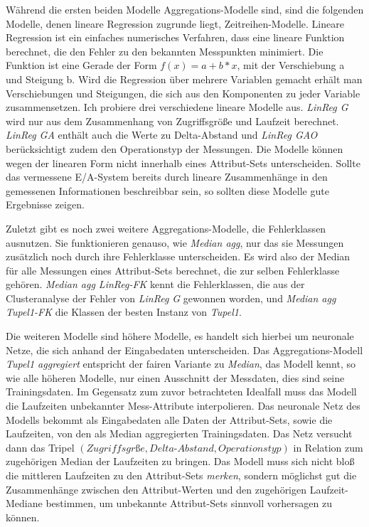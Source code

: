 \documentclass[
	12pt,
	a4paper,
	BCOR10mm,
	DIV14,
	listof=totoc,
	bibliography=totoc,
	headsepline
]{scrreprt}
\begin{document}
Während die ersten beiden Modelle Aggregations-Modelle sind, sind die folgenden Modelle, denen lineare Regression zugrunde liegt, Zeitreihen-Modelle.
Lineare Regression ist ein einfaches numerisches Verfahren, dass eine lineare Funktion berechnet, die den Fehler zu den bekannten Messpunkten minimiert.
Die Funktion ist eine Gerade der Form $f(x) = a + b*x$, mit der Verschiebung a und Steigung b. Wird die Regression über mehrere Variablen gemacht erhält man Verschiebungen und Steigungen, die sich aus den Komponenten zu jeder Variable zusammensetzen.
Ich probiere drei verschiedene lineare Modelle aus.
\textit{LinReg G} wird nur aus dem Zusammenhang von Zugriffsgröße und Laufzeit berechnet.
\textit{LinReg GA} enthält auch die Werte zu Delta-Abstand und \textit{LinReg GAO} berücksichtigt zudem den Operationstyp der Messungen.
Die Modelle können wegen der linearen Form nicht innerhalb eines Attribut-Sets unterscheiden. Sollte das vermessene E/A-System bereits durch lineare Zusammenhänge in den gemessenen Informationen beschreibbar sein, so sollten diese Modelle gute Ergebnisse zeigen.

Zuletzt gibt es noch zwei weitere Aggregations-Modelle, die Fehlerklassen ausnutzen.
Sie funktionieren genauso, wie \textit{Median agg}, nur das sie Messungen zusätzlich noch durch ihre Fehlerklasse unterscheiden. Es wird also der Median für alle Messungen eines Attribut-Sets berechnet, die zur selben Fehlerklasse gehören.
\textit{Median agg LinReg-FK} kennt die Fehlerklassen, die aus der Clusteranalyse der Fehler von \textit{LinReg G} gewonnen worden, und \textit{Median agg Tupel1-FK} die Klassen der besten Instanz von \textit{Tupel1}.

Die weiteren Modelle sind höhere Modelle, es handelt sich hierbei um neuronale Netze, die sich anhand der Eingabedaten unterscheiden.
Das Aggregations-Modell \textit{Tupel1 aggregiert} entspricht der fairen Variante zu \textit{Median}, das Modell kennt, so wie alle höheren Modelle, nur einen Ausschnitt der Messdaten, dies sind seine Trainingsdaten.
Im Gegensatz zum zuvor betrachteten Idealfall muss das Modell die Laufzeiten unbekannter Mess-Attribute interpolieren.
Das neuronale Netz des Modells bekommt als Eingabedaten alle Daten der Attribut-Sets, sowie die Laufzeiten, von den als Median aggregierten Trainingsdaten.
Das Netz versucht dann das Tripel $(Zugriffsgr\text{ß}e, Delta\text{-}Abstand, Operationstyp)$ in Relation zum zugehörigen Median der Laufzeiten zu bringen.
Das Modell muss sich nicht bloß die mittleren Laufzeiten zu den Attribut-Sets \textit{merken}, sondern möglichst gut die Zusammenhänge zwischen den Attribut-Werten und den zugehörigen Laufzeit-Mediane bestimmen, um unbekannte Attribut-Sets sinnvoll vorhersagen zu können.
\end{document}
